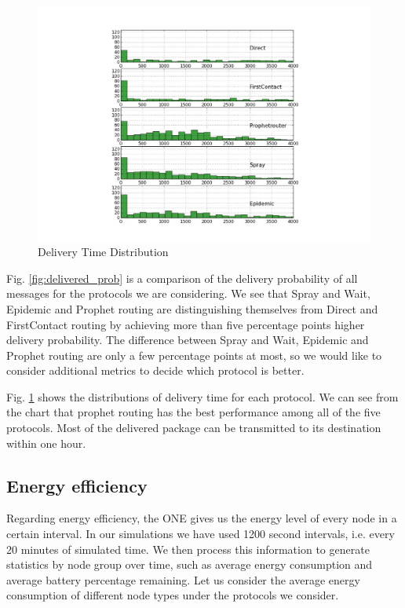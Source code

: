 \documentclass[conference]{IEEEtran}
\begin{document}
\begin{figure}
  \includegraphics[scale=0.4, center]{../one_1.5.1-RC2/plots/Delivery_Time_Distribution.pdf}
  \caption{Delivery Time Distribution}
  \label{fig:time_distribution}
\end{figure}

Fig. \ref{fig:delivered_prob} is a comparison of the delivery probability of all messages for the protocols we are considering. We see that Spray and Wait, Epidemic and Prophet routing are distinguishing themselves from Direct and FirstContact routing by achieving more than five percentage points higher delivery probability. The difference between Spray and Wait, Epidemic and Prophet routing are only a few percentage points at most, so we would like to consider additional metrics to decide which protocol is better.

Fig. \ref{fig:time_distribution} shows the distributions of delivery time for each protocol. We can see from the chart that prophet routing has the best performance among all of the five protocols. Most of the delivered package can be transmitted to its destination within one hour.

\subsection{Energy efficiency}

Regarding energy efficiency, the ONE gives us the energy level of every node in a certain interval. In our simulations we have used 1200 second intervals, i.e. every 20 minutes of simulated time. We then process this information to generate statistics by node group over time, such as average energy consumption and average battery percentage remaining. Let us consider the average energy consumption of different node types under the protocols we consider.
\end{document}
